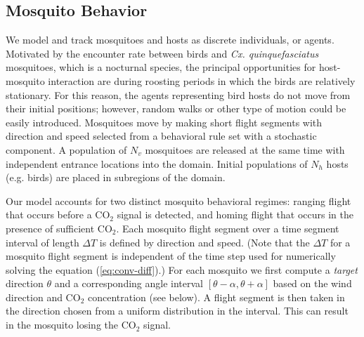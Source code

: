 \documentclass[12pt]{article}
\begin{document}
\subsection{Mosquito Behavior}
We model and track mosquitoes and hosts as discrete individuals, or
agents. Motivated by the
encounter rate between birds and \textsl{Cx. quinquefasciatus}
mosquitoes, which is a nocturnal species, the principal
opportunities for host-mosquito interaction are during roosting
periods in which the birds are relatively stationary. For this
reason, the agents representing bird hosts do not move from
their initial positions; however, random walks or other type of
motion could be easily introduced. Mosquitoes move by making short flight segments with
direction and speed selected from a behavioral rule set with a stochastic component.
%
A population of $N_v$ mosquitoes are released at the same time with independent entrance locations into the domain.
Initial populations of $N_h$ hosts (e.g. birds) are placed in subregions of the domain.

Our model accounts for two distinct mosquito behavioral
regimes: ranging flight that occurs before a CO$_2$ signal is
detected, and homing flight that occurs in the presence of
sufficient CO$_2$.    Each mosquito flight segment over a time segment
interval of length $\Delta T$ is defined by direction and
speed. (Note that the $\Delta T$ for a mosquito flight segment is
independent of the time step used for numerically solving the
equation (\ref{eq:conv-diff}).)  For each mosquito we first compute a {\em target}
direction $\theta$ and a corresponding angle interval
$[\theta-\alpha, \theta+\alpha]$ based on the wind direction
and CO$_2$ concentration (see below).  A flight segment is then taken in
the direction chosen from a uniform distribution in the
interval. This can result in the mosquito losing the  CO$_2$
signal.
\end{document}

